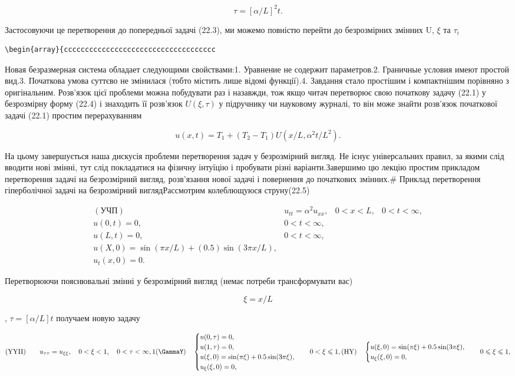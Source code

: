 \documentclass[
  ukrainian,
]{article}
\begin{document}
\[
\tau = [\alpha/L]^2 t.
\]

Застосовуючи це перетворення до попередньої задачі (22.3), ми можемо
повністю перейти до безрозмірних змінних U, \(\xi\) та \(\tau_i\)

\begin{verbatim}
\begin{array}{cccccccccccccccccccccccccccccccccccc
\end{verbatim}

Новая безразмерная система обладает следующими свойствами:1. Уравнение
не содержит параметров.2. Граничные условия имеют простой вид.3.
Початкова умова суттєво не змінилася (тобто містить лише відомі
функції).4. Завдання стало простішим і компактнішим порівняно з
оригінальним. Розв'язок цієї проблеми можна побудувати раз і назавжди,
тож якщо читач перетворює свою початкову задачу (22.1) у безрозмірну
форму (22.4) і знаходить її розв'язок \(U(\xi, \tau)\) у підручнику чи
науковому журналі, то він може знайти розв'язок початкової задачі (22.1)
простим перерахуванням

\[
u(x, t) = T_1 + (T_2 - T_1) U(x/L, \alpha^2 t/L^2).
\]

На цьому завершується наша дискусія проблеми перетворення задач у
безрозмірний вигляд. Не існує універсальних правил, за якими слід
вводити нові змінні, тут слід покладатися на фізичну інтуїцію і
пробувати різні варіанти.Завершимо цю лекцію простим прикладом
перетворення задачі на безрозмірний вигляд, розв'язання нової задачі і
повернення до початкових змінних.\# Приклад перетворення гіперболічної
задачі на безрозмірний виглядРассмотрим колеблющуюся струну(22.5)

\[
\begin{array}{llll} (\text{УЧП}) & u_{tt} = \alpha^2 u_{xx}, & 0 < x < L, & 0 < t < \infty, \\ u(0, t) = 0, & 0 < t < \infty, \\ u(L, t) = 0, & 0 < t < \infty, \\ u(X, 0) = \sin(\pi x/L) + (0.5)\sin(3\pi x/L), \\ u_t(x, 0) = 0. & \end{array}
\]

Перетворюючи пояснювальні змінні у безрозмірний вигляд (немає потреби
трансформувати вас)

\[
\xi = x/L
\]

, \(\tau = [\alpha/L] t\) получаем новую задачу

\[
(\text{YYII}) \qquad u_{\tau\tau} = u_{\xi\xi}, \quad 0 < \xi < 1, \quad 0 < \tau < \infty, 1
(\text{\GammaY}) \quad
\begin{cases} u(0, \tau) = 0, \\ u(1, \tau) = 0, \\ u(\xi, 0) = \sin(\pi\xi) + 0.5\sin(3\pi\xi), \\ u_{\xi}(\xi, 0) = 0, \end{cases}
\quad 0 < \xi \leqslant 1,
(\text{HY}) \quad
\begin{cases} u(\xi, 0) = \sin(\pi\xi) + 0.5\sin(3\pi\xi), \\ u_{\xi}(\xi, 0) = 0, \end{cases}
\quad 0 \leqslant \xi \leqslant 1,
\]
\end{document}
